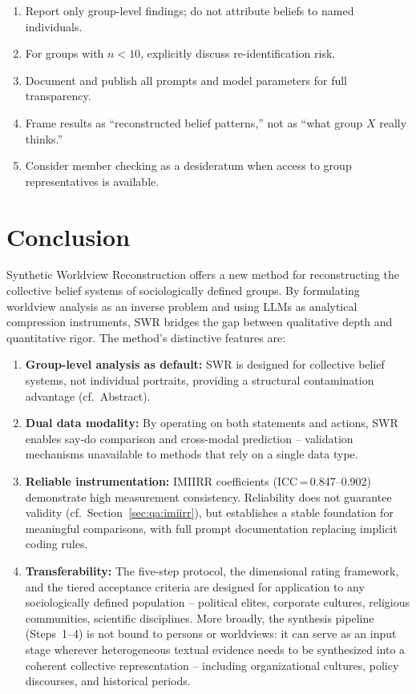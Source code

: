 \documentclass[11pt,a4paper]{article}
\begin{document}
\begin{enumerate}[nosep]
  \item Report only group-level findings; do not attribute beliefs to named individuals.
  \item For groups with $n < 10$, explicitly discuss re-identification risk.
  \item Document and publish all prompts and model parameters for full transparency.
  \item Frame results as ``reconstructed belief patterns,'' not as ``what group $X$ really thinks.''
  \item Consider member checking \citep{SoysalTurkmen2024} as a desideratum when access to group representatives is available.
\end{enumerate}


\section{Conclusion}
\label{sec:conclusion}

Synthetic Worldview Reconstruction offers a new method for reconstructing the collective belief systems of sociologically defined groups. By formulating worldview analysis as an inverse problem and using LLMs as analytical compression instruments, SWR bridges the gap between qualitative depth and quantitative rigor. The method's distinctive features are:

\begin{enumerate}[nosep]
  \item \textbf{Group-level analysis as default:} SWR is designed for collective belief systems, not individual portraits, providing a structural contamination advantage (cf.\ Abstract).
  \item \textbf{Dual data modality:} By operating on both statements and actions, SWR enables say-do comparison and cross-modal prediction -- validation mechanisms unavailable to methods that rely on a single data type.
  \item \textbf{Reliable instrumentation:} IMIIRR coefficients (ICC\,=\,0.847--0.902) demonstrate high measurement consistency. Reliability does not guarantee validity (cf.\ Section~\ref{sec:qa:imiirr}), but establishes a stable foundation for meaningful comparisons, with full prompt documentation replacing implicit coding rules.
  \item \textbf{Transferability:} The five-step protocol, the dimensional rating framework, and the tiered acceptance criteria are designed for application to any sociologically defined population -- political elites, corporate cultures, religious communities, scientific disciplines. More broadly, the synthesis pipeline (Steps~1--4) is not bound to persons or worldviews: it can serve as an input stage wherever heterogeneous textual evidence needs to be synthesized into a coherent collective representation -- including organizational cultures, policy discourses, and historical periods.
\end{enumerate}
\end{document}
